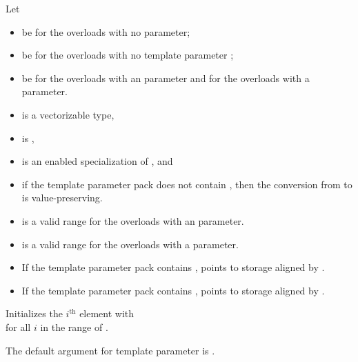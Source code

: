 \begin{itemdescr}
\pnum
Let
\begin{itemize}
 \item
    be  for the overloads with no
    parameter;
 \item
    be  for the overloads with no
   template parameter ;
 \item
    be  for the overloads with an 
   parameter and  for the overloads with a 
   parameter.
\end{itemize}

\pnum
\mandates
\begin{itemize}
 \item
    is a vectorizable type,
 \item
    is ,
 \item
    is an enabled specialization of , and
 \item
   if the template parameter pack  does not contain
   , then the conversion from
    to  is
   value-preserving.
\end{itemize}

\pnum
\expects
\begin{itemize}
 \item
    is a valid range for the overloads with an
    parameter.
 \item
    is a valid range for the overloads with a 
   parameter.
 \item
   If the template parameter pack  contains
   ,  points to storage
   aligned by .
 \item
   If the template parameter pack  contains
   ,  points to
   storage aligned by .
\end{itemize}

\pnum
\effects
Initializes the $i^\text{th}$ element with\\
 for all $i$ in the range of
.

\pnum
\remarks
The default argument for template parameter  is
.
\end{itemdescr}

